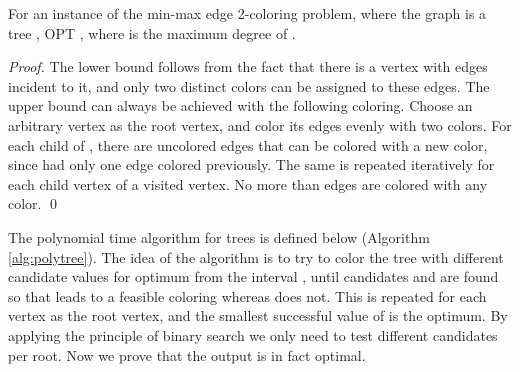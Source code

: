 \documentclass[runningheads, a4paper]{llncs}
\begin{document}
\begin{lemma}\label{lemma:minmax-opt-trees}
For an instance of the min-max edge 2-coloring problem, where the graph is a tree , OPT , where  is the maximum degree of .
\end{lemma}
\begin{proof}
The lower bound follows from the fact that there is a vertex with  edges incident to it, and only two distinct colors can be assigned to these edges. The upper bound can always be achieved with the following coloring. Choose an arbitrary vertex  as the root vertex, and color its edges evenly with two colors. For each child  of , there are  uncolored edges that can be colored with a new color, since  had only one edge colored previously. The same is repeated iteratively for each child vertex of a visited vertex. No more than  edges are colored with any color. \qed
\end{proof}

The polynomial time algorithm for trees is defined below (Algorithm \ref{alg:polytree}). The idea of the algorithm is to try to color the tree with different candidate values for optimum from the interval , until candidates  and  are found so that  leads to a feasible coloring whereas  does not. This is repeated for each vertex as the root vertex, and the smallest successful value of  is the optimum. By applying the principle of binary search we only need to test  different candidates per root. Now we prove that the output is in fact optimal.
\end{document}
